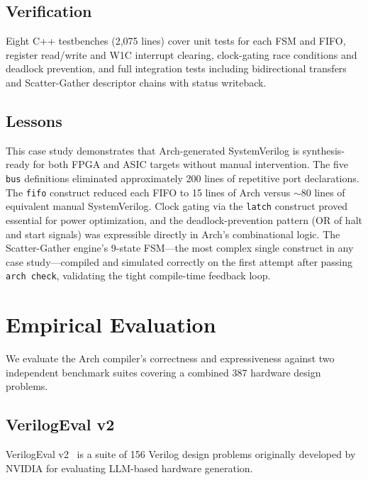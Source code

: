 \documentclass[11pt,twocolumn]{article}
\begin{document}
\subsection{Verification}

Eight C++ testbenches (2,075 lines) cover unit tests for each FSM and FIFO, register read/write and W1C interrupt clearing, clock-gating race conditions and deadlock prevention, and full integration tests including bidirectional transfers and Scatter-Gather descriptor chains with status writeback.

\subsection{Lessons}

This case study demonstrates that Arch-generated SystemVerilog is synthesis-ready for both FPGA and ASIC targets without manual intervention. The five \texttt{bus} definitions eliminated approximately 200 lines of repetitive port declarations. The \texttt{fifo} construct reduced each FIFO to 15 lines of Arch versus ${\sim}$80 lines of equivalent manual SystemVerilog. Clock gating via the \texttt{latch} construct proved essential for power optimization, and the deadlock-prevention pattern (OR of halt and start signals) was expressible directly in Arch's combinational logic. The Scatter-Gather engine's 9-state FSM---the most complex single construct in any case study---compiled and simulated correctly on the first attempt after passing \texttt{arch check}, validating the tight compile-time feedback loop.

\section{Empirical Evaluation}\label{sec:benchmark}

We evaluate the Arch compiler's correctness and expressiveness against two independent benchmark suites covering a combined 387 hardware design problems.

\subsection{VerilogEval v2}\label{sec:verilogeval}

VerilogEval v2~\cite{verilogeval} is a suite of 156 Verilog design problems originally developed by NVIDIA for evaluating LLM-based hardware generation.
\end{document}
